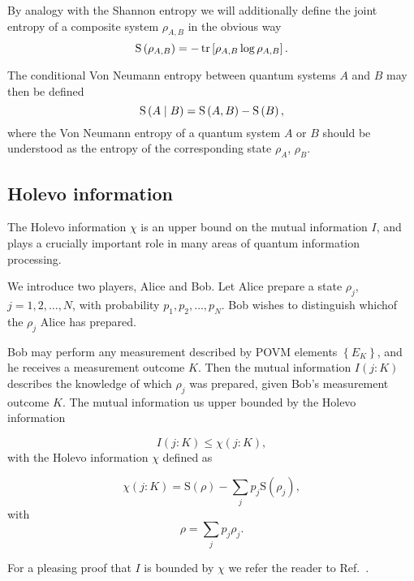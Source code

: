 By analogy with the Shannon entropy we will additionally define the joint entropy of a composite system $\rho_{A, B}$ in the obvious way
\begin{equation}
\text{S}\left(\rho_{A, B}\right) = - \tr\left[\rho_{A, B} \log \rho_{A, B}\right].
\end{equation}

\noindent The conditional Von Neumann entropy between quantum systems $A$ and $B$ may then be defined
\begin{equation}
\text{S}\left(A \; \middle| \; B\right) = \text{S}\left(A, B\right) - \text{S}\left(B\right),
\end{equation}
where the Von Neumann entropy of a quantum system $A$ or $B$ should be understood as the entropy of the corresponding state $\rho_A$, $\rho_B$.


\FloatBarrier
\subsection{Holevo information}
The Holevo information $\chi$ is an upper bound on the mutual information $I$, and plays a crucially important role in many areas of quantum information processing. 

We introduce two players, Alice and Bob. Let Alice prepare a state $\rho_j$, $j = 1, 2, \dots, N$, with probability $p_1, p_2, \dots, p_N$. Bob wishes to distinguish whichof the $\rho_j$ Alice has prepared. 

Bob may perform any measurement described by POVM elements $\left\{E_K\right\}$, and he receives a measurement outcome $K$. Then the mutual information $I\left(j : K\right)$ describes the knowledge of which $\rho_j$ was prepared, given Bob's measurement outcome $K$. The mutual information us upper bounded by the Holevo information

\begin{equation}\label{eqn:intro_holevo_bound}
I\left(j : K \right) \le \chi \left(j : K \right),
\end{equation}
with the Holevo information $\chi$ defined as

\begin{equation}\label{eqn:intro_holevo}
\chi\left(j : K\right)  = \text{S}\left(\rho\right) - \sum_j p_j \text{S}\left(\rho_j\right),
\end{equation}
with
\begin{equation}
\rho = \sum_j p_j \rho_j.
\end{equation}

\noindent For a pleasing proof that $I$ is bounded by $\chi$ we refer the reader to Ref.~\cite{Nielsen2010}. 

